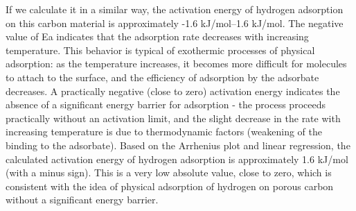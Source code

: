 \begin{multicols}{2}
If we calculate it in a similar way, the activation energy of hydrogen
adsorption on this carbon material is approximately -1.6 kJ/mol--1.6
kJ/mol. The negative value of Ea indicates that the adsorption rate
decreases with increasing temperature. This behavior is typical of
exothermic processes of physical adsorption: as the temperature
increases, it becomes more difficult for molecules to attach to the
surface, and the efficiency of adsorption by the adsorbate decreases. A
practically negative (close to zero) activation energy indicates the
absence of a significant energy barrier for adsorption - the process
proceeds practically without an activation limit, and the slight
decrease in the rate with increasing temperature is due to thermodynamic
factors (weakening of the binding to the adsorbate). Based on the
Arrhenius plot and linear regression, the calculated activation energy
of hydrogen adsorption is approximately 1.6 kJ/mol (with a minus sign).
This is a very low absolute value, close to zero, which is consistent
with the idea of \hspace{0pt}\hspace{0pt}physical adsorption of hydrogen
on porous carbon without a significant energy barrier.
\end{multicols}


